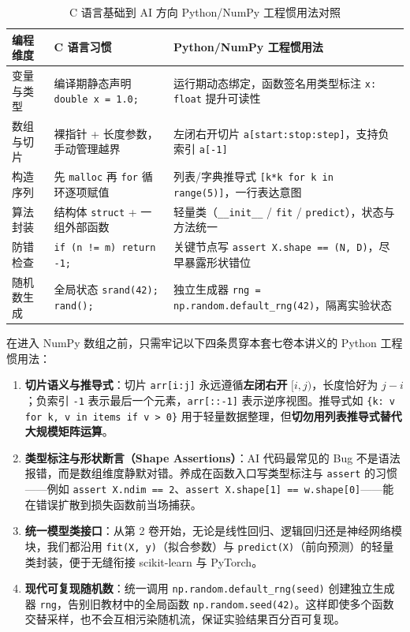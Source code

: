 \begin{table}[htbp]
\centering
\caption{C 语言基础到 AI 方向 Python/NumPy 工程惯用法对照}\label{tab:c-vs-py}
{\small
\begin{tabularx}{\linewidth}{@{}p{24mm}p{52mm}X@{}}
\toprule
\textbf{编程维度} & \textbf{C 语言习惯} & \textbf{Python/NumPy 工程惯用法} \\
\midrule
变量与类型 & 编译期静态声明 \texttt{double x = 1.0;} & 运行期动态绑定，函数签名用类型标注 \texttt{x: float} 提升可读性 \\
数组与切片 & 裸指针 + 长度参数，手动管理越界 & 左闭右开切片 \texttt{a[start:stop:step]}，支持负索引 \texttt{a[-1]} \\
构造序列 & 先 \texttt{malloc} 再 \texttt{for} 循环逐项赋值 & 列表/字典推导式 \texttt{[k*k for k in range(5)]}，一行表达意图 \\
算法封装 & 结构体 \texttt{struct} + 一组外部函数 & 轻量类（\texttt{\_\_init\_\_} / \texttt{fit} / \texttt{predict}），状态与方法统一 \\
防错检查 & \texttt{if (n != m) return -1;} & 关键节点写 \texttt{assert X.shape == (N, D)}，尽早暴露形状错位 \\
随机数生成 & 全局状态 \texttt{srand(42); rand();} & 独立生成器 \texttt{rng = np.random.default\_rng(42)}，隔离实验状态 \\
\bottomrule
\end{tabularx}}
\end{table}

在进入 NumPy 数组之前，只需牢记以下四条贯穿本套七卷本讲义的 Python 工程惯用法：

\begin{enumerate}
  \item \textbf{切片语义与推导式}：切片 \texttt{arr[i:j]} 永远遵循\textbf{左闭右开} $[i, j)$，长度恰好为 $j - i$；负索引 \texttt{-1} 表示最后一个元素，\texttt{arr[::-1]} 表示逆序视图。推导式如 \texttt{\{k: v for k, v in items if v > 0\}} 用于轻量数据整理，但\textbf{切勿用列表推导式替代大规模矩阵运算}。
  \item \textbf{类型标注与形状断言（Shape Assertions）}：AI 代码最常见的 Bug 不是语法报错，而是数组维度静默对错。养成在函数入口写类型标注与 \texttt{assert} 的习惯——例如 \texttt{assert X.ndim == 2}、\texttt{assert X.shape[1] == w.shape[0]}——能在错误扩散到损失函数前当场捕获。
  \item \textbf{统一模型类接口}：从第 2 卷开始，无论是线性回归、逻辑回归还是神经网络模块，我们都沿用 \texttt{fit(X, y)}（拟合参数）与 \texttt{predict(X)}（前向预测）的轻量类封装，便于无缝衔接 scikit-learn 与 PyTorch。
  \item \textbf{现代可复现随机数}：统一调用 \texttt{np.random.default\_rng(seed)} 创建独立生成器 \texttt{rng}，告别旧教材中的全局函数 \texttt{np.random.seed(42)}。这样即使多个函数交替采样，也不会互相污染随机流，保证实验结果百分百可复现。
\end{enumerate}


